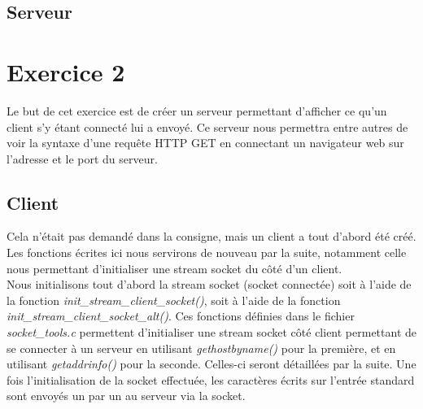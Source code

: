 \documentclass[a4paper, frenchb, 11pt]{article}
\begin{document}

\subsection{Serveur}



\newpage

\section{Exercice 2}
Le but de cet exercice est de créer un serveur permettant d'afficher ce qu'un client s'y étant connecté lui a envoyé. Ce serveur nous permettra entre autres de voir la syntaxe d'une requête HTTP GET en connectant un navigateur web sur l'adresse et le port du serveur.

\subsection{Client}
Cela n'était pas demandé dans la consigne, mais un client a tout d'abord été créé. Les fonctions écrites ici nous servirons de nouveau par la suite, notamment celle nous permettant d'initialiser une stream socket du côté d'un client.\\

Nous initialisons tout d'abord la stream socket (socket connectée) soit à l'aide de la fonction \emph{init\_stream\_client\_socket()}, soit à l'aide de la fonction \emph{init\_stream\_client\_socket\_alt()}. Ces fonctions définies dans le fichier \emph{socket\_tools.c} permettent d'initialiser une stream socket côté client permettant de se connecter à un serveur en utilisant \emph{gethostbyname()} pour la première, et en utilisant \emph{getaddrinfo()} pour la seconde. Celles-ci seront détaillées par la suite. Une fois l'initialisation de la socket effectuée, les caractères écrits sur l'entrée standard sont envoyés un par un au serveur via la socket.
\end{document}
